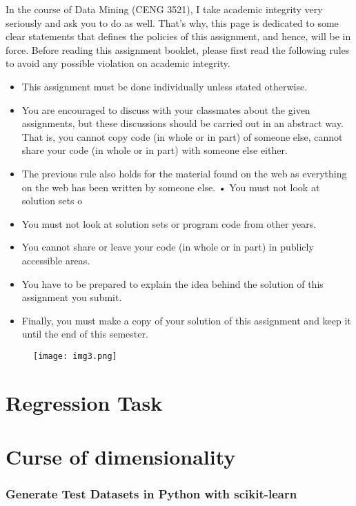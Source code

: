 \documentclass[onecolumn]{article}
\begin{document}
In the course of Data Mining (CENG 3521), I take academic integrity very seriously and ask
you to do as well. That’s why, this page is dedicated to some clear statements that defines
the policies of this assignment, and hence, will be in force. Before reading this assignment
booklet, please first read the following rules to avoid any possible violation on academic
integrity.
\\
\begin{itemize}
\item This assignment must be done individually unless stated otherwise.
\item You are encouraged to discuss with your classmates about the given assignments, but
these discussions should be carried out in an abstract way. That is, you cannot copy
code (in whole or in part) of someone else, cannot share your code (in whole or in part)
with someone else either.
\item The previous rule also holds for the material found on the web as everything on the web
has been written by someone else.
• You must not look at solution sets o
\item You must not look at solution sets or program code from other years.
\item You cannot share or leave your code (in whole or in part) in publicly accessible areas.
\item You have to be prepared to explain the idea behind the solution of this assignment you
submit.
\item Finally, you must make a copy of your solution of this assignment and keep it until the
end of this semester.

\end{itemize}
\begin{figure}[ht!]
\centering
\texttt{[image: img3.png]}
\end{figure}




\section{Regression Task}
\label{sec:2}

\section{Curse of dimensionality}
\label{sec:2}

\subsubsection{ Generate Test Datasets in Python with scikit-learn}
\label{sec:2.0.1}
\end{document}
